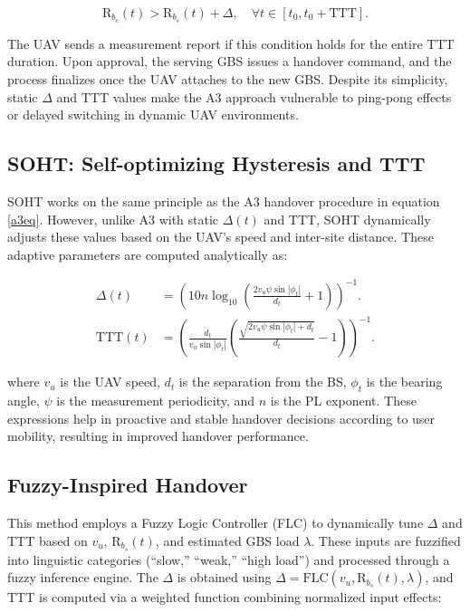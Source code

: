 \documentclass[10pt,conference]{IEEEtran}
\begin{document}
\begin{equation}
\label{a3eq}
\text{R}_{b_c}(t) > \text{R}_{b_s}(t) + \Delta, \quad \forall t \in [t_0, t_0 + \text{TTT}].
\end{equation}

The UAV sends a measurement report if this condition holds for the entire TTT duration. Upon approval, the serving GBS issues a handover command, and the process finalizes once the UAV attaches to the new GBS. Despite its simplicity, static $\Delta$ and TTT values make the A3 approach vulnerable to ping-pong effects or delayed switching in dynamic UAV environments.

\subsection{SOHT: Self-optimizing Hysteresis and TTT}
SOHT works on the same principle as the A3 handover procedure in equation \eqref{a3eq}. However, unlike A3 with static $\Delta(t)$ and TTT, SOHT dynamically adjusts these values based on the UAV's speed and inter-site distance. These adaptive parameters are computed analytically as:

\begin{align}
\Delta(t) &= \left(10n \log_{10}\left(\frac{2v_u \psi \sin |\phi_t|}{d_t} + 1\right)\right)^{-1}. \\
\mathrm{TTT}(t) &= \left(\frac{d_t}{v_u \sin |\phi_t|} \left(\frac{\sqrt{2v_u \psi \sin |\phi_t| + d_t}}{d_t} - 1\right)\right)^{-1}.
\end{align}

where $v_u$ is the UAV speed, $d_t$ is the separation from the BS, $\phi_t$ is the bearing angle, $\psi$ is the measurement periodicity, and $n$ is the PL exponent. These expressions help in proactive and stable handover decisions according to user mobility, resulting in improved handover performance. 


\subsection{Fuzzy-Inspired Handover}
This method employs a Fuzzy Logic Controller (FLC) to dynamically tune $\Delta$ and TTT based on $v_u$, $\mathrm{R}_{b_s}(t)$, and estimated GBS load $\lambda$. These inputs are fuzzified into linguistic categories (``slow,'' ``weak,'' ``high load'') and processed through a fuzzy inference engine. The $\Delta$ is obtained using $\Delta = \mathrm{FLC}(v_u, \mathrm{R}_{b_s}(t), \lambda)$, and TTT is computed via a weighted function combining normalized input effects: 
\end{document}
